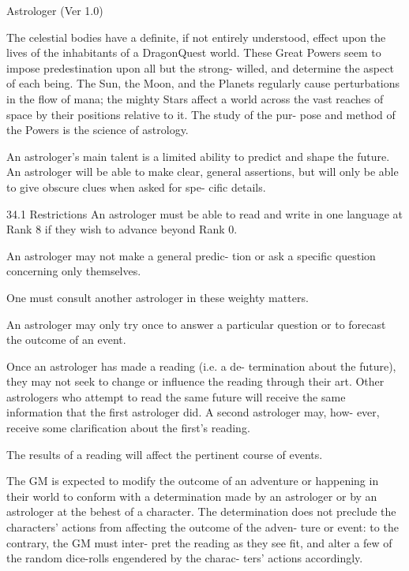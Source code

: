 \begin{Chapter}{Astrologer (Ver 1.0)}

The celestial bodies have a definite, if not entirely 
understood, effect upon the lives of the inhabitants 
of a DragonQuest world. These Great Powers seem 
to  impose  predestination  upon  all  but  the  strong-
willed, and determine the aspect of each being. The 
Sun,  the  Moon,  and  the  Planets  regularly  cause 
perturbations in the flow of mana; the mighty Stars 
affect  a  world  across  the  vast  reaches  of  space  by 
their  positions  relative  to  it.  The  study  of  the  pur-
pose  and  method  of  the  Powers  is  the  science  of 
astrology. 

An  astrologer’s  main  talent  is  a  limited  ability  to 
predict and shape the future. An astrologer  will be 
able to make clear, general assertions, but will only 
be  able  to  give  obscure  clues  when  asked  for  spe-
cific details. 

34.1 Restrictions 
An astrologer must be able to read and write in one 
language at Rank 8 if they wish to advance beyond 
Rank 0. 

An  astrologer  may  not  make  a  general  predic-
tion  or  ask  a  specific  question  concerning  only 
themselves. 

One  must  consult  another  astrologer  in  these 
weighty matters. 

An  astrologer  may  only  try  once  to  answer  a 
particular question or to forecast the outcome of 
an event. 

Once  an  astrologer  has  made  a  reading  (i.e.  a  de-
termination about the future), they may not seek to 
change  or  influence  the  reading  through  their  art. 
Other  astrologers  who  attempt  to  read  the  same 
future  will  receive  the  same  information  that  the 
first astrologer did. A second astrologer may, how-
ever,  receive  some  clarification  about  the  first’s 
reading. 

The results of a reading will affect the pertinent 
course of events. 

The  GM  is  expected  to  modify  the  outcome  of  an 
adventure  or  happening  in  their  world  to  conform 
with  a  determination  made  by  an  astrologer  or  by 
an  astrologer  at  the  behest  of  a  character.  The 
determination  does  not  preclude  the  characters’ 
actions  from  affecting  the  outcome  of  the  adven-
ture  or  event:  to  the  contrary,  the  GM  must  inter-
pret  the  reading  as  they  see  fit,  and  alter  a  few  of 
the  random  dice-rolls  engendered  by  the  charac-
ters’ actions accordingly. 


\end{Chapter}
